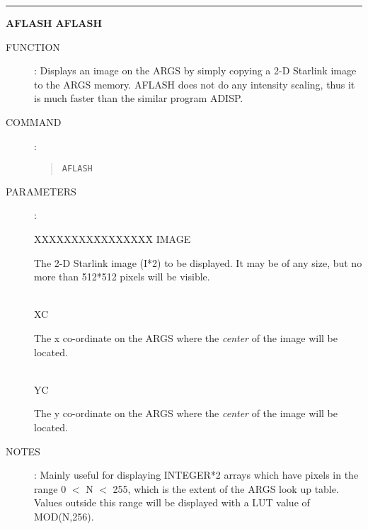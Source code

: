 \goodbreak
\rule{\textwidth}{0.3mm}
{\Large {\bf AFLASH} \hfill {\bf AFLASH}}
\begin{description}
\item [FUNCTION]:
Displays an image on the ARGS by simply copying a 2-D Starlink image to the
ARGS memory.
AFLASH does not do any intensity scaling, thus it is much faster than the
similar program ADISP.
\item [COMMAND]:
\begin{quote}
{\tt AFLASH}
\end{quote}
\item [PARAMETERS]:
\begin{tabbing}
XXXXXXXX\=XXXXXXXX\=\kill
IMAGE\>\>\begin{minipage}[t]{100mm}
The 2-D Starlink image (I*2) to  be displayed.
It may be of any size, but no more than 512*512 pixels will be visible.
\end{minipage}\\
XC\>\begin{minipage}[t]{100mm}
The x co-ordinate on the ARGS where the {\em center} of the image will be
located.
\end{minipage}\\
YC\>\begin{minipage}[t]{100mm}
The y co-ordinate on the ARGS where the {\em center} of the image will be
located.
\end{minipage}
\end{tabbing}
\item [NOTES]:
Mainly useful for displaying INTEGER*2 arrays which have pixels in the range
0 $<$ N $<$ 255, which is the extent of the ARGS look up table.
Values outside this range will be displayed with a LUT value of MOD(N,256).
\end{description}

